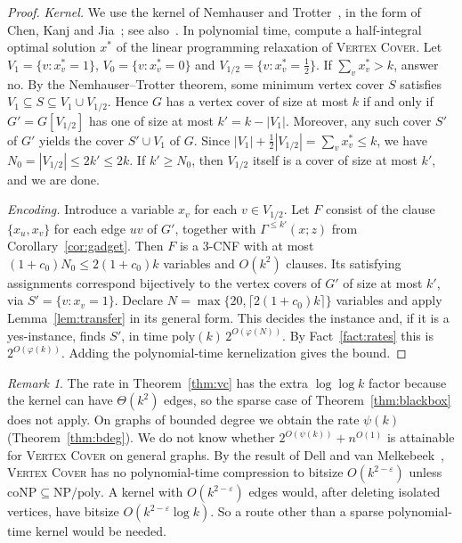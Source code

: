 \documentclass[11pt]{amsart}
\theoremstyle{definition}
\theoremstyle{remark}
\newtheorem{remark}[theorem]{Remark}
\newcommand{\poly}{\mathrm{poly}}
\newcommand{\VC}{\textup{\textsc{Vertex Cover}}}
\begin{document}
\begin{proof}
\emph{Kernel.} We use the kernel of Nemhauser and Trotter~\cite{NT75}, in the form of Chen, Kanj and Jia~\cite{CKJ01}; see also~\cite[Chapter~2]{CFK15}. In polynomial time, compute a half-integral optimal solution $x^*$ of the linear programming relaxation of \VC. Let $V_1=\{v:x^*_v=1\}$, $V_0=\{v:x^*_v=0\}$ and $V_{1/2}=\{v:x^*_v=\frac12\}$. If $\sum_v x^*_v>k$, answer no. By the Nemhauser--Trotter theorem, some minimum vertex cover $S$ satisfies $V_1\subseteq S\subseteq V_1\cup V_{1/2}$. Hence $G$ has a vertex cover of size at most $k$ if and only if $G'=G[V_{1/2}]$ has one of size at most $k'=k-|V_1|$. Moreover, any such cover $S'$ of $G'$ yields the cover $S'\cup V_1$ of $G$. Since $|V_1|+\frac12|V_{1/2}|=\sum_v x_v^*\le k$, we have $N_0=|V_{1/2}|\le 2k'\le 2k$. If $k'\ge N_0$, then $V_{1/2}$ itself is a cover of size at most $k'$, and we are done.

\emph{Encoding.} Introduce a variable $x_v$ for each $v\in V_{1/2}$. Let $F$ consist of the clause $\{x_u,x_v\}$ for each edge $uv$ of $G'$, together with $\Gamma^{\le k'}(x;z)$ from Corollary~\ref{cor:gadget}. Then $F$ is a $3$-CNF with at most $(1+c_0)N_0\le 2(1+c_0)k$ variables and $O(k^2)$ clauses. Its satisfying assignments correspond bijectively to the vertex covers of $G'$ of size at most $k'$, via $S'=\{v:x_v=1\}$. Declare $N=\max\{20,\lceil 2(1+c_0)k\rceil\}$ variables and apply Lemma~\ref{lem:transfer} in its general form. This decides the instance and, if it is a yes-instance, finds $S'$, in time $\poly(k)\,2^{O(\varphi(N))}$. By Fact~\ref{fact:rates} this is $2^{O(\varphi(k))}$. Adding the polynomial-time kernelization gives the bound.
\end{proof}

\begin{remark}
The rate in Theorem~\ref{thm:vc} has the extra $\log\log k$ factor because the kernel can have $\Theta(k^2)$ edges, so the sparse case of Theorem~\ref{thm:blackbox} does not apply. On graphs of bounded degree we obtain the rate $\psi(k)$ (Theorem~\ref{thm:bdeg}). We do not know whether $2^{O(\psi(k))}+n^{O(1)}$ is attainable for \VC{} on general graphs. By the result of Dell and van Melkebeek~\cite{DvM14}, \VC{} has no polynomial-time compression to bitsize $O(k^{2-\varepsilon})$ unless $\mathrm{coNP}\subseteq\mathrm{NP}/\mathrm{poly}$. A kernel with $O(k^{2-\varepsilon})$ edges would, after deleting isolated vertices, have bitsize $O(k^{2-\varepsilon}\log k)$. So a route other than a sparse polynomial-time kernel would be needed.
\end{remark}
\end{document}
